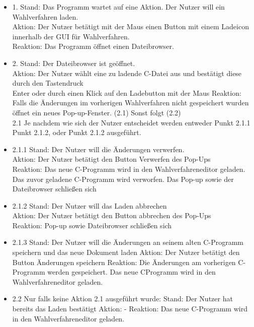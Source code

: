 \documentclass[a4paper]{scrreprt}
\begin{document}
\begin{itemize}

\item 1. Stand: Das Programm wartet auf eine Aktion. Der Nutzer will ein Wahlverfahren laden.\\
Aktion: Der Nutzer betätigt mit der Maus einen Button mit einem Ladeicon innerhalb der GUI für Wahlverfahren.\\
Reaktion: Das Programm öffnet einen Dateibrowser.\\

\item 2. Stand: Der Dateibrowser ist geöffnet.\\
Aktion: Der Nutzer wählt eine zu ladende C-Datei aus und bestätigt diese durch den Tastendruck\\
Enter oder durch einen Klick auf den Ladebutton mit der Maus
Reaktion: Falls die Änderungen im vorherigen Wahlverfahren nicht gespeichert wurden öffnet ein neues Pop-up-Fenster. (2.1) Sonst folgt (2.2)\\

2.1 Je nachdem wie sich der Nutzer entscheidet werden entweder Punkt 2.1.1 Punkt 2.1.2, oder Punkt 2.1.2 ausgeführt.

\item 2.1.1 Stand: Der Nutzer will die Änderungen verwerfen.\\
Aktion: Der Nutzer betätigt den Button Verwerfen des Pop-Ups\\
Reaktion: Das neue C-Programm wird in den Wahlverfahreneditor geladen. Das zuvor
geladene C-Programm wird verworfen. Das Pop-up sowie der Dateibrowser
schließen sich\\

\item 2.1.2 Stand: Der Nutzer will das Laden abbrechen\\
Aktion: Der Nutzer betätigt den Button abbrechen des Pop-Ups\\
Reaktion: Pop-up sowie Dateibrowser schließen sich\\

\item 2.1.3 Stand: Der Nutzer will die Änderungen an seinem alten C-Programm speichern und das
neue Dokument laden
Aktion: Der Nutzer betätigt den Button Änderungen speichern
Reaktion: Die Änderungen am vorherigen C-Programm werden gespeichert. Das neue CProgramm
wird in den Wahlverfahreneditor geladen.

\item 2.2
Nur falls keine Aktion 2.1 ausgeführt wurde:
Stand: Der Nutzer hat bereits das Laden bestätigt
Aktion: -
Reaktion: Das neue C-Programm wird in den Wahlverfahreneditor geladen.

\end{itemize}
\end{document}
